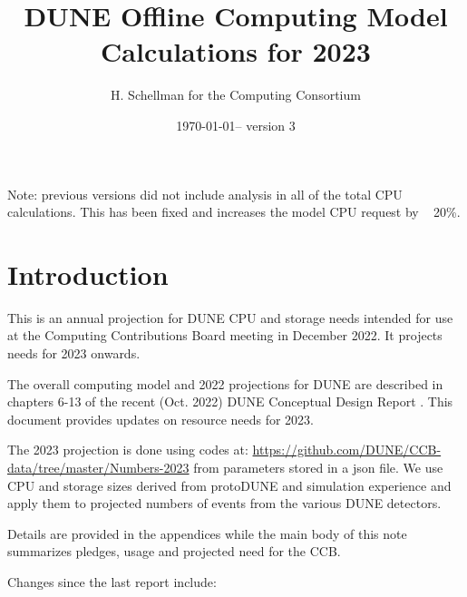 \documentclass[12pt]{article}
\title{DUNE Offline Computing Model Calculations for 2023}
\author{H. Schellman for the Computing Consortium}
\date{\today -- version 3}
\begin{document}
\makeatletter
{}
\makeatother
\newcommand{\csvautotabularright}[2][]{\csvloop{autotabularright={#2},#1}}

\maketitle

Note: previous versions did not include analysis in all of the total CPU calculations.  This has been fixed and increases the model CPU request by ~ 20\%.
\section{Introduction}

This is an annual projection for DUNE CPU and storage needs intended for use at the Computing Contributions Board meeting in December 2022. It projects needs for 2023 onwards. 

The overall computing model  and 2022 projections for DUNE are described in chapters 6-13 of the recent (Oct. 2022) DUNE Conceptual Design Report \cite{DUNE:2022fcw}.   This document provides updates on resource needs for 2023. 

The 2023 projection is done using codes at: \href{https://github.com/DUNE/CCB-data/tree/master/Numbers-2023}{https://github.com/DUNE/CCB-data/tree/master/Numbers-2023} from parameters stored in a json file. We use CPU and storage sizes derived from protoDUNE and simulation experience and apply them to projected numbers of events from the various DUNE detectors. 

Details are provided in the appendices while the main body of this note summarizes pledges, usage and projected need for the CCB.




Changes since the last report include:
\end{document}

